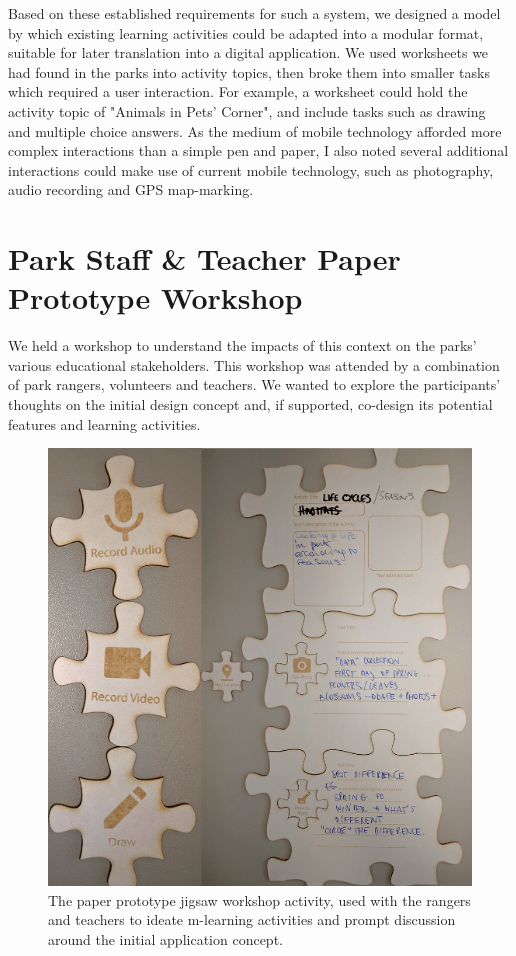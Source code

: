 Based on these established requirements for such a system, we designed a model by which existing learning activities could be adapted into a modular format, suitable for later translation into a digital application. We used worksheets we had found in the parks into activity topics, then broke them into smaller tasks which required a user interaction. For example, a worksheet could hold the activity topic of "Animals in Pets' Corner", and include tasks such as drawing and multiple choice answers. As the medium of mobile technology afforded more complex interactions than a simple pen and paper, I also noted several additional interactions could make use of current mobile technology, such as photography, audio recording and GPS map-marking.

\section{Park Staff \& Teacher Paper Prototype Workshop}
\label{sec:PrototypeWorkshop}

We held a workshop to understand the impacts of this context on the parks’ various educational stakeholders. This workshop was attended by a combination of park rangers, volunteers and teachers. We wanted to explore the participants’ thoughts on the initial design concept and, if supported, co-design its potential features and learning activities.

\begin{figure}
  \centering
  \includegraphics[width=0.8\columnwidth]{images/chapter04/rangerJigsaw.png}
  \caption[The jigsaw prototyping activity]{The paper prototype jigsaw workshop activity, used with the rangers and teachers to ideate m-learning activities and prompt discussion around the initial application concept.}
  \label{fig:rangerJigsaw}
\end{figure}

